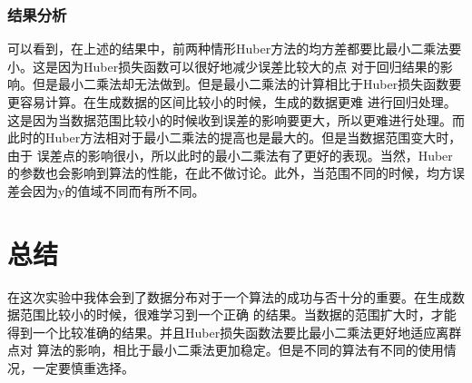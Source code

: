 \documentclass[final]{cvpr}
\begin{document}
\subsubsection{结果分析}
可以看到，在上述的结果中，前两种情形Huber方法的均方差都要比最小二乘法要小。这是因为Huber损失函数可以很好地减少误差比较大的点
对于回归结果的影响。但是最小二乘法却无法做到。但是最小二乘法的计算相比于Huber损失函数要更容易计算。在生成数据的区间比较小的时候，生成的数据更难
进行回归处理。这是因为当数据范围比较小的时候收到误差的影响要更大，所以更难进行处理。而此时的Huber方法相对于最小二乘法的提高也是最大的。但是当数据范围变大时，由于
误差点的影响很小，所以此时的最小二乘法有了更好的表现。当然，Huber的参数也会影响到算法的性能，在此不做讨论。此外，当范围不同的时候，均方误差会因为y的值域不同而有所不同。

\section{总结}\label{sec:Conclusion}
在这次实验中我体会到了数据分布对于一个算法的成功与否十分的重要。在生成数据范围比较小的时候，很难学习到一个正确
的结果。当数据的范围扩大时，才能得到一个比较准确的结果。并且Huber损失函数法要比最小二乘法更好地适应离群点对
算法的影响，相比于最小二乘法更加稳定。但是不同的算法有不同的使用情况，一定要慎重选择。





\end{document}
